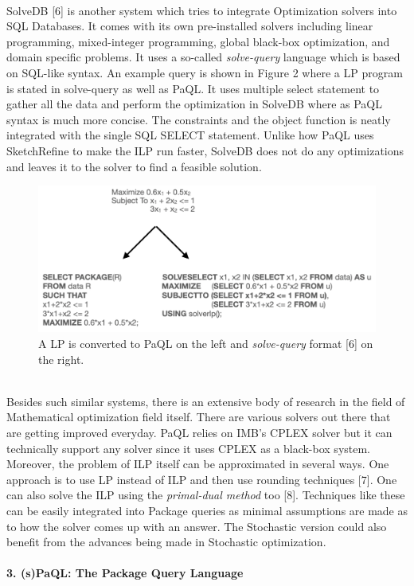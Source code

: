 \documentclass[a4paper,12pt]{article}
\begin{document}
\\
SolveDB [6] is another system which tries to integrate Optimization solvers into SQL Databases.  It comes with its own pre-installed solvers including linear programming, mixed-integer programming, global black-box optimization, and domain specific problems. It uses a so-called \textit{solve-query} language which is based on SQL-like syntax. An example query is shown in Figure 2 where a LP program is stated in solve-query as well as PaQL. It uses multiple select statement to gather all the data and perform the optimization in SolveDB where as PaQL syntax is much more concise. The constraints and the object function is neatly integrated with the single SQL SELECT statement. Unlike how PaQL uses SketchRefine to make the ILP run faster, SolveDB does not do any optimizations and leaves it to the solver to find a feasible solution.

\begin{figure}[h]
\includegraphics[scale=.7]{2}
\caption{A LP is converted to PaQL on the left and \textit{solve-query} format [6] on the right.}
\centering
\end{figure}

\\
Besides such similar systems, there is an extensive body of research in the field of Mathematical optimization field itself. There are various solvers out there that are getting improved everyday. PaQL relies on IMB's CPLEX solver but it can technically support any solver since it uses CPLEX as a black-box system. Moreover, the problem of ILP itself can be approximated in several ways. One approach is to use LP instead of ILP and then use rounding techniques [7]. One can also solve the ILP using the \textit{primal-dual method} too [8]. Techniques like these can be easily integrated into Package queries as minimal assumptions are made as to how the solver comes up with an answer. The Stochastic version could also benefit from the advances being made in Stochastic optimization. 
\vspace{5mm}
\\\\
\textbf{3. (s)PaQL: The Package Query Language}
\end{document}
